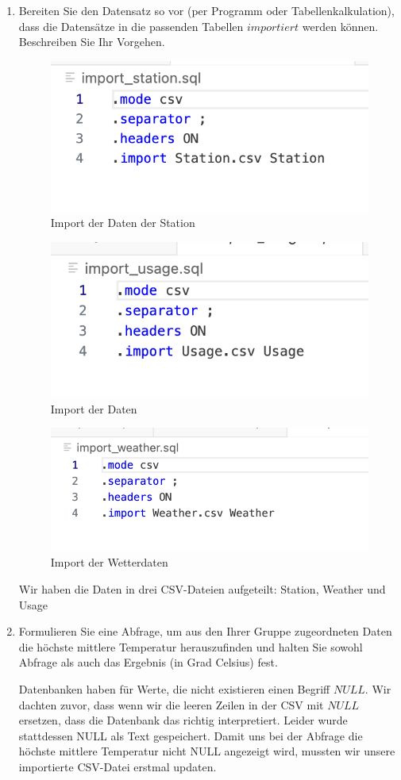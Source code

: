 \documentclass{article}
\begin{document}
\begin{enumerate}
\item Bereiten Sie den Datensatz so vor (per Programm oder Tabellenkalkulation), dass die Datensätze in die passenden Tabellen $importiert$ werden können. Beschreiben Sie Ihr Vorgehen.


\begin{figure}[h]
    \centering
    \includegraphics[width=0.5\linewidth]{import_station.png}
    \caption{Import der Daten der Station}
    \label{fig:enter-label}
\end{figure}

\begin{figure}[h]
    \centering
    \includegraphics[width=0.5\linewidth]{import_usage.png}
    \caption{Import der Daten}
    \label{fig:enter-label}
\end{figure}

\begin{figure}[h]
    \centering
    \includegraphics[width=0.6\linewidth]{import_weather1.png}
    \caption{Import der Wetterdaten}
    \label{fig:enter-label}
\end{figure}

Wir haben die Daten in drei CSV-Dateien aufgeteilt: Station, Weather und Usage 

\item Formulieren Sie eine Abfrage, um aus den Ihrer Gruppe zugeordneten Daten die höchste mittlere Temperatur herauszufinden und halten Sie sowohl Abfrage als auch das Ergebnis (in Grad Celsius) fest. 

Datenbanken haben für Werte, die nicht existieren einen Begriff $NULL$. Wir dachten zuvor, dass wenn wir die leeren Zeilen in der CSV mit $NULL$ ersetzen, dass die Datenbank das richtig interpretiert. Leider wurde stattdessen NULL als Text gespeichert. Damit uns bei der Abfrage die höchste mittlere Temperatur nicht NULL angezeigt wird, mussten wir unsere importierte CSV-Datei erstmal updaten.
\end{enumerate}  
\end{document}
